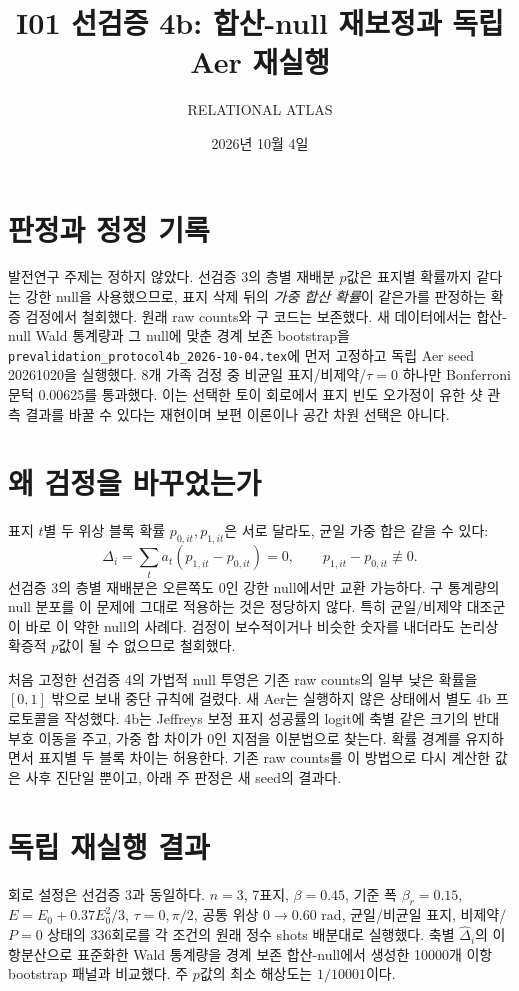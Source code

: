 \documentclass[11pt,a4paper]{article}
\title{I01 선검증 4b: 합산-null 재보정과 독립 Aer 재실행}
\author{RELATIONAL ATLAS}
\date{2026년 10월 4일}
\begin{document}
\maketitle

\section{판정과 정정 기록}
발전연구 주제는 정하지 않았다. 선검증 3의 층별 재배분 $p$값은
표지별 확률까지 같다는 강한 null을 사용했으므로, 표지 삭제 뒤의
\emph{가중 합산 확률}이 같은가를 판정하는 확증 검정에서 철회했다.
원래 raw counts와 구 코드는 보존했다. 새 데이터에서는
합산-null Wald 통계량과 그 null에 맞춘 경계 보존 bootstrap을
\texttt{prevalidation\_protocol4b\_2026-10-04.tex}에 먼저 고정하고
독립 Aer seed 20261020을 실행했다. 8개 가족 검정 중 비균일
표지/비제약/$\tau=0$ 하나만 Bonferroni 문턱 0.00625를 통과했다.
이는 선택한 토이 회로에서 표지 빈도 오가정이 유한 샷 관측 결과를
바꿀 수 있다는 재현이며 보편 이론이나 공간 차원 선택은 아니다.

\section{왜 검정을 바꾸었는가}
표지 $t$별 두 위상 블록 확률 $p_{0,it},p_{1,it}$은 서로 달라도,
균일 가중 합은 같을 수 있다:
\begin{equation}
\Delta_i=\sum_t a_t(p_{1,it}-p_{0,it})=0,
\qquad p_{1,it}-p_{0,it}\not\equiv0.
\end{equation}
선검증 3의 층별 재배분은 오른쪽도 0인 강한 null에서만 교환
가능하다. 구 통계량의 null 분포를 이 문제에 그대로 적용하는 것은
정당하지 않다. 특히 균일/비제약 대조군이 바로 이 약한 null의
사례다. 검정이 보수적이거나 비슷한 숫자를 내더라도 논리상
확증적 $p$값이 될 수 없으므로 철회했다.

처음 고정한 선검증 4의 가법적 null 투영은 기존 raw counts의
일부 낮은 확률을 $[0,1]$ 밖으로 보내 중단 규칙에 걸렸다.
새 Aer는 실행하지 않은 상태에서 별도 4b 프로토콜을 작성했다.
4b는 Jeffreys 보정 표지 성공률의 logit에 축별 같은 크기의
반대 부호 이동을 주고, 가중 합 차이가 0인 지점을 이분법으로
찾는다. 확률 경계를 유지하면서 표지별 두 블록 차이는 허용한다.
기존 raw counts를 이 방법으로 다시 계산한 값은 사후 진단일
뿐이고, 아래 주 판정은 새 seed의 결과다.

\section{독립 재실행 결과}
회로 설정은 선검증 3과 동일하다. $n=3$, 7표지,
$\beta=0.45$, 기준 폭 $\beta_r=0.15$,
$E=E_0+0.37E_0^2/3$, $\tau=0,\pi/2$, 공통 위상
$0\to0.60$ rad, 균일/비균일 표지, 비제약/$P=0$ 상태의
336회로를 각 조건의 원래 정수 shots 배분대로 실행했다.
축별 $\hat\Delta_i$의 이항분산으로 표준화한 Wald 통계량을
경계 보존 합산-null에서 생성한 10000개 이항 bootstrap 패널과
비교했다. 주 $p$값의 최소 해상도는 $1/10001$이다.
\end{document}
